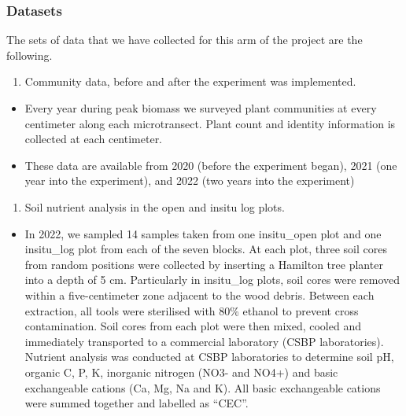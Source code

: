 \documentclass[
]{article}
\providecommand{\tightlist}{%
  \setlength{\itemsep}{0pt}\setlength{\parskip}{0pt}}
\begin{document}
\hypertarget{datasets}{%
\subsubsection{Datasets}\label{datasets}}

The sets of data that we have collected for this arm of the project are
the following.

\begin{enumerate}
\def\labelenumi{(\arabic{enumi})}
\tightlist
\item
  Community data, before and after the experiment was implemented.
\end{enumerate}

\begin{itemize}
\tightlist
\item
  Every year during peak biomass we surveyed plant communities at every
  centimeter along each microtransect. Plant count and identity
  information is collected at each centimeter.
\item
  These data are available from 2020 (before the experiment began), 2021
  (one year into the experiment), and 2022 (two years into the
  experiment)
\end{itemize}

\begin{enumerate}
\def\labelenumi{(\arabic{enumi})}
\setcounter{enumi}{1}
\tightlist
\item
  Soil nutrient analysis in the open and insitu log plots.
\end{enumerate}

\begin{itemize}
\tightlist
\item
  In 2022, we sampled 14 samples taken from one insitu\_open plot and
  one insitu\_log plot from each of the seven blocks. At each plot,
  three soil cores from random positions were collected by inserting a
  Hamilton tree planter into a depth of 5 cm. Particularly in
  insitu\_log plots, soil cores were removed within a five-centimeter
  zone adjacent to the wood debris. Between each extraction, all tools
  were sterilised with 80\% ethanol to prevent cross contamination. Soil
  cores from each plot were then mixed, cooled and immediately
  transported to a commercial laboratory (CSBP laboratories). Nutrient
  analysis was conducted at CSBP laboratories to determine soil pH,
  organic C, P, K, inorganic nitrogen (NO3- and NO4+) and basic
  exchangeable cations (Ca, Mg, Na and K). All basic exchangeable
  cations were summed together and labelled as ``CEC''.
\end{itemize}
\end{document}
